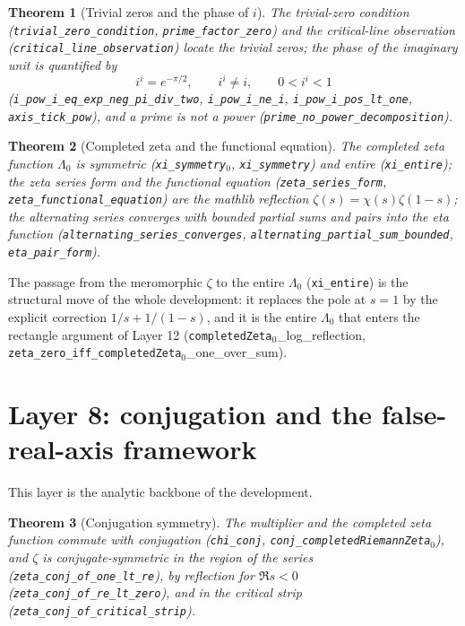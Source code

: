 \documentclass{article}
\newtheorem{theorem}{Theorem}[section]
\newcommand{\zt}{\zeta}
\newcommand{\Lam}{\Lambda}
\newcommand{\Xchi}{\chi}
\begin{document}
\begin{theorem}[Trivial zeros and the phase of $i$]
\label{thm:trivial}
The trivial-zero condition (\texttt{trivial\_zero\_condition},
\texttt{prime\_factor\_zero}) and the critical-line observation
(\texttt{critical\_line\_observation}) locate the trivial zeros; the phase
of the imaginary unit is quantified by
\[
i^i=e^{-\pi/2},\qquad i^i\neq i,\qquad 0<i^i<1
\]
(\texttt{i\_pow\_i\_eq\_exp\_neg\_pi\_div\_two}, \texttt{i\_pow\_i\_ne\_i},
\texttt{i\_pow\_i\_pos\_lt\_one}, \texttt{axis\_tick\_pow}), and a prime is
not a power (\texttt{prime\_no\_power\_decomposition}).
\end{theorem}

\begin{theorem}[Completed zeta and the functional equation]
\label{thm:xi}
The completed zeta function $\Lam_0$ is symmetric
(\texttt{xi\_symmetry}\(_0\), \texttt{xi\_symmetry}) and entire
(\texttt{xi\_entire}); the zeta series form and the functional equation
(\texttt{zeta\_series\_form}, \texttt{zeta\_functional\_equation}) are the
mathlib reflection $\zt(s)=\Xchi(s)\zt(1-s)$; the alternating series
converges with bounded partial sums and pairs into the eta function
(\texttt{alternating\_series\_converges},
\texttt{alternating\_partial\_sum\_bounded}, \texttt{eta\_pair\_form}).
\end{theorem}

The passage from the meromorphic $\zt$ to the entire $\Lam_0$
(\texttt{xi\_entire}) is the
structural move of the whole development: it replaces the pole at $s=1$ by
the explicit correction $1/s+1/(1-s)$, and it is the entire $\Lam_0$ that
enters the rectangle argument of Layer 12
(\texttt{completedZeta}\(_0\)\_log\_reflection,
\texttt{zeta\_zero\_iff\_completedZeta}\(_0\)\_one\_over\_sum).

\section{Layer 8: conjugation and the false-real-axis framework}
\label{sec:L8}

This layer is the analytic backbone of the development.

\begin{theorem}[Conjugation symmetry]
\label{thm:conj}
The multiplier and the completed zeta function commute with conjugation
(\texttt{chi\_conj}, \texttt{conj\_completedRiemannZeta}\(_0\)), and $\zt$
is conjugate-symmetric in the region of the series
(\texttt{zeta\_conj\_of\_one\_lt\_re}), by reflection for $\Re s<0$
(\texttt{zeta\_conj\_of\_re\_lt\_zero}), and in the critical strip
(\texttt{zeta\_conj\_of\_critical\_strip}).
\end{theorem}
\end{document}
